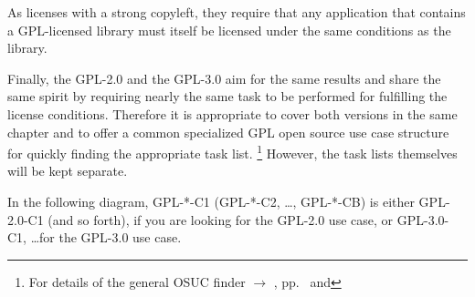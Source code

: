 As licenses with a strong copyleft, they require that any application that
contains a GPL-licensed library must itself be licensed under the same
conditions as the library.
 
Finally, the GPL-2.0 and the GPL-3.0 aim for the same results and share the
same spirit by requiring nearly the same task to be performed for fulfilling the
license conditions.  Therefore it is appropriate to cover both versions in the
same chapter and to offer a common specialized GPL open source use case
structure for quickly finding the appropriate task list.%
  \footnote{For details of the general OSUC finder $\rightarrow$ \oslic,
    pp.\ \pageref{OsucTokens} and \pageref{OsucDefinitionTree}}
However, the task lists themselves will be kept separate.

In the following diagram, GPL-*-C1 (GPL-*-C2, \ldots, GPL-*-CB) is either
GPL-2.0-C1 (and so forth), if you are looking for the GPL-2.0 use case, or
GPL-3.0-C1, \ldots for the GPL-3.0 use case.




\newcommand{\useCaseOne}{%
  \gtbUseCaseOne{GPL-\ver}
  \gtbCoversOne{GPL-\ver}}

\newcommand{\useCaseTwo}{%
  \gtbUseCaseTwo{GPL-\ver}
  \gtbCoversTwo{GPL-\ver}}

\newcommand{\useCaseThree}{%
  \gtbUseCaseThree{GPL-\ver}
  \gtbCoversThree{GPL-\ver}}

\newcommand{\useCaseFour}{%
  \gtbUseCaseFour{GPL-\ver}
  \gtbCoversFour{GPL-\ver}}

\newcommand{\useCaseFive}{%
  \gtbUseCaseFive{GPL-\ver}
  \gtbCoversFive{GPL-\ver}}

\newcommand{\useCaseSix}{%
  \gtbUseCaseSix{GPL-\ver}
  \gtbCoversSix{GPL-\ver}}

\newcommand{\useCaseSeven}{%
  \gtbUseCaseSeven{GPL-\ver}
  \gtbCoversSeven{GPL-\ver}}

\newcommand{\useCaseEight}{%
  \gtbUseCaseEight{GPL-\ver}
  \gtbCoversEight{GPL-\ver}}

\newcommand{\useCaseNine}{%
  \gtbUseCaseNine{GPL-\ver}
  \gtbCoversNine{GPL-\ver}}

\newcommand{\useCaseA}{%
  \gtbUseCaseA{GPL-\ver}
  \gtbCoversA{GPL-\ver}}

